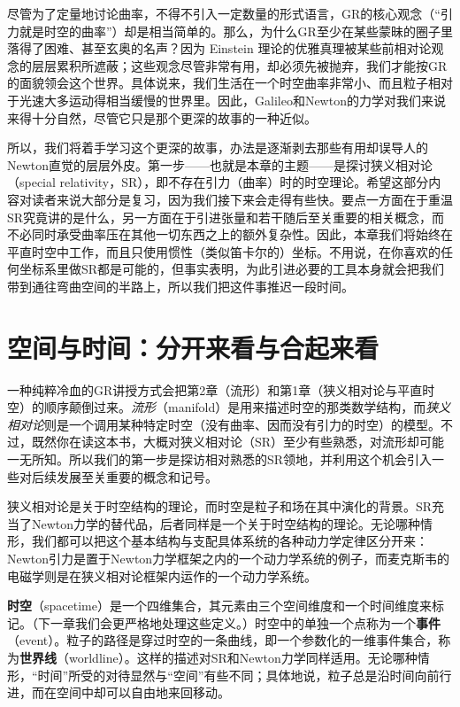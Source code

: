 尽管为了定量地讨论曲率，不得不引入一定数量的形式语言，GR的核心观念（“引力就是时空的曲率”）却是相当简单的。那么，为什么GR至少在某些蒙昧的圈子里落得了困难、甚至玄奥的名声？因为 Einstein 理论的优雅真理被某些前相对论观念的层层累积所遮蔽；这些观念尽管非常有用，却必须先被抛弃，我们才能按GR的面貌领会这个世界。具体说来，我们生活在一个时空曲率非常小、而且粒子相对于光速大多运动得相当缓慢的世界里。因此，Galileo和Newton的力学对我们来说来得十分自然，尽管它只是那个更深的故事的一种近似。

所以，我们将着手学习这个更深的故事，办法是逐渐剥去那些有用却误导人的Newton直觉的层层外皮。第一步——也就是本章的主题——是探讨狭义相对论（special relativity，SR），即不存在引力（曲率）时的时空理论。希望这部分内容对读者来说大部分是复习，因为我们接下来会走得有些快。要点一方面在于重温SR究竟讲的是什么，另一方面在于引进张量和若干随后至关重要的相关概念，而不必同时承受曲率压在其他一切东西之上的额外复杂性。因此，本章我们将始终在平直时空中工作，而且只使用惯性（类似笛卡尔的）坐标。不用说，在你喜欢的任何坐标系里做SR都是可能的，但事实表明，为此引进必要的工具本身就会把我们带到通往弯曲空间的半路上，所以我们把这件事推迟一段时间。

\section{空间与时间：分开来看与合起来看}

一种纯粹冷血的GR讲授方式会把第2章（流形）和第1章（狭义相对论与平直时空）的顺序颠倒过来。\emph{流形}（manifold）是用来描述时空的那类数学结构，而\emph{狭义相对论}则是一个调用某种特定时空（没有曲率、因而没有引力的时空）的模型。不过，既然你在读这本书，大概对狭义相对论（SR）至少有些熟悉，对流形却可能一无所知。所以我们的第一步是探访相对熟悉的SR领地，并利用这个机会引入一些对后续发展至关重要的概念和记号。

狭义相对论是关于时空结构的理论，而时空是粒子和场在其中演化的背景。SR充当了Newton力学的替代品，后者同样是一个关于时空结构的理论。无论哪种情形，我们都可以把这个基本结构与支配具体系统的各种动力学定律区分开来：Newton引力是置于Newton力学框架之内的一个动力学系统的例子，而麦克斯韦的电磁学则是在狭义相对论框架内运作的一个动力学系统。


\textbf{时空}（spacetime）是一个四维集合，其元素由三个空间维度和一个时间维度来标记。（下一章我们会更严格地处理这些定义。）时空中的单独一个点称为一个\textbf{事件}（event）。粒子的路径是穿过时空的一条曲线，即一个参数化的一维事件集合，称为\textbf{世界线}（worldline）。这样的描述对SR和Newton力学同样适用。无论哪种情形，“时间”所受的对待显然与“空间”有些不同；具体地说，粒子总是沿时间向前行进，而在空间中却可以自由地来回移动。

